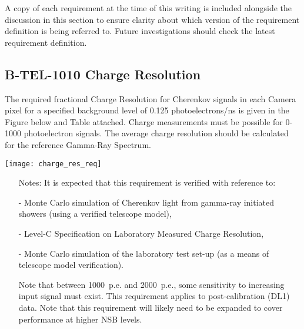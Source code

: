 A copy of each requirement at the time of this writing is included alongside the discussion in this section to ensure clarity about which version of the requirement definition is being referred to. Future investigations should check the latest requirement definition. \vfill

\begin{requirement}{\subsection{B-TEL-1010 Charge Resolution}}
	The required fractional Charge Resolution for Cherenkov signals in each Camera pixel for a specified background level of 0.125 photoelectrons/ns is given in the Figure below and Table attached. Charge measurements must be possible for 0-1000 photoelectron signals. The average charge resolution should be calculated for the reference Gamma-Ray Spectrum.
    
	\centering\texttt{[image: charge\_res\_req]}
	\label{fig:charge_res_req}
    
\begin{itemize}
\item [Notes:] It is expected that this requirement is verified with reference to:

- Monte Carlo simulation of Cherenkov light from gamma-ray initiated showers (using a verified telescope model),

- Level-C Specification on Laboratory Measured Charge Resolution,

- Monte Carlo simulation of the laboratory test set-up (as a means of telescope model verification).

Note that between 1000~p.e. and 2000~p.e., some sensitivity to increasing input signal must exist. \newline
This requirement applies to post-calibration (DL1) data. \newline
Note that this requirement will likely need to be expanded to cover performance at higher NSB levels.
\end{itemize}
\end{requirement}

